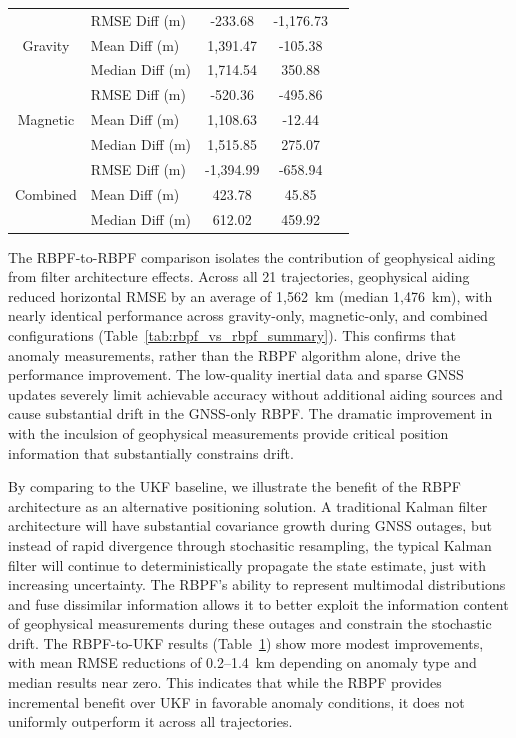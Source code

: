 \documentclass[letterpaper,times]{IONconf}
\begin{document}
\begin{table}[h]
\begin{tabular}{c l c c c}
        \midrule
        \multirow{3}{*}{Gravity} & RMSE Diff (m)   & -233.68  & -1,176.73 \\
                                 & Mean Diff (m)   & 1,391.47 & -105.38 \\
                                 & Median Diff (m) & 1,714.54 & 350.88\\
        \midrule
        \multirow{3}{*}{Magnetic} & RMSE Diff (m)   & -520.36 & -495.86 \\
                                  & Mean Diff (m)   & 1,108.63 & -12.44\\
                                  & Median Diff (m) & 1,515.85 & 275.07 \\
        \midrule
        \multirow{3}{*}{Combined} & RMSE Diff (m)   & -1,394.99 & -658.94 \\
                                  & Mean Diff (m)   & 423.78   & 45.85 \\
                                  & Median Diff (m) & 612.02   & 459.92 \\
        \bottomrule
    \end{tabular}
    \label{tab:rbpf_vs_ukf_summary}
\end{table}

The RBPF-to-RBPF comparison isolates the contribution of geophysical aiding from filter architecture effects. Across all 21 trajectories, geophysical aiding reduced horizontal RMSE by an average of 1,562~km (median 1,476~km), with nearly identical performance across gravity-only, magnetic-only, and combined configurations (Table~\ref{tab:rbpf_vs_rbpf_summary}). This confirms that anomaly measurements, rather than the RBPF algorithm alone, drive the performance improvement. The low-quality inertial data and sparse GNSS updates severely limit achievable accuracy without additional aiding sources and cause substantial drift in the GNSS-only RBPF. The dramatic improvement in with the inculsion of geophysical measurements provide critical position information that substantially constrains drift. 

By comparing to the UKF baseline, we illustrate the benefit of the RBPF architecture as an alternative positioning solution. A traditional Kalman filter architecture will have substantial covariance growth during GNSS outages, but instead of rapid divergence through stochasitic resampling, the typical Kalman filter will continue to deterministically propagate the state estimate, just with increasing uncertainty. The RBPF's ability to represent multimodal distributions and fuse dissimilar information allows it to better exploit the information content of geophysical measurements during these outages and constrain the stochastic drift. The RBPF-to-UKF results (Table~\ref{tab:rbpf_vs_ukf_summary}) show more modest improvements, with mean RMSE reductions of 0.2--1.4~km depending on anomaly type and median results near zero. This indicates that while the RBPF provides incremental benefit over UKF in favorable anomaly conditions, it does not uniformly outperform it across all trajectories.
\end{document}
